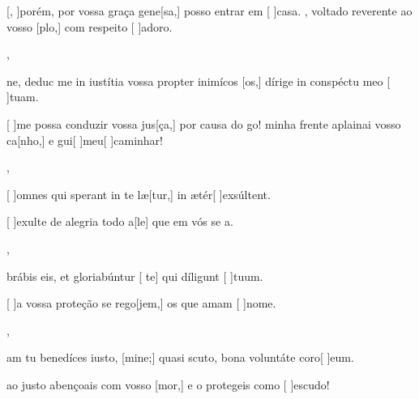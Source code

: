 {    {\item {}[, ]{po}rém, por vossa graça gene[sa,] posso entrar em [ ]{ca}sa. , voltado reverente ao vosso [plo,] com respeito [ ]{a}{do}ro.~\Antiphona},
  {\item {}ne, deduc me in iustítia vossa propter inimícos [os,] dírige in conspéctu meo [ ]tuam.~\Antiphona}%
    {\item {}[ ]{me} possa conduzir vossa jus[ça,] por causa do go!  minha frente aplainai vosso ca[\-nho,] e gui[ ]{meu}[ ]{ca}minhar!~\Antiphona},
  {\item {}[ ]{om}nes qui sperant in te læ[tur,] in ætér[ ]{ex}{súl}\-tent.~\Antiphona}%
    {\item {}[ ]{e}xulte de alegria todo a[le] que em vós se a.~\Antiphona},
  {\item {}brábis eis, et gloriabúntur [ te] qui díligunt [ ]{tu}um.~\Antiphona}%
    {\item {}[ ]{a} vossa proteção se rego[jem,] os que amam [ ]{no}me.~\Antiphona},
  {\item {}am tu benedíces iusto, [mine;] quasi scuto, bona voluntáte coro[ ]{e}um.~\Antiphona}%
    {\item {} ao justo abençoais com vosso [mor,] e o protegeis como [ ]{es}{cu}do!~\Antiphona}
}